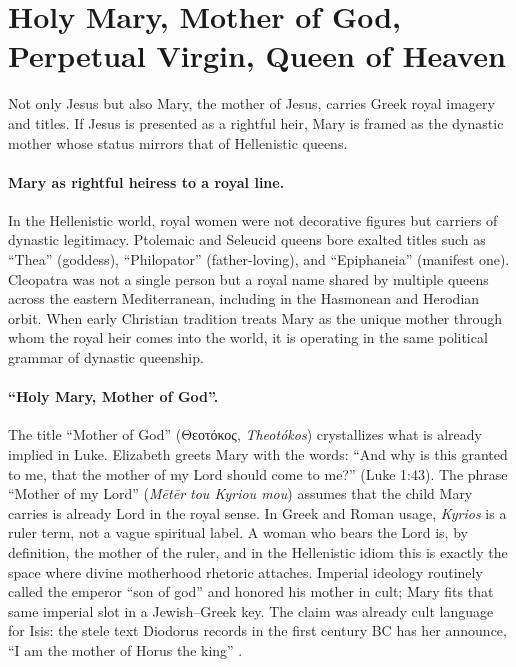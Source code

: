 \section{Holy Mary, Mother of God, Perpetual Virgin, Queen of Heaven}\label{sec:holy-mary-mother-of-god-perpetual-virgin-queen-of-heaven}

Not only Jesus but also Mary, the mother of Jesus, carries Greek royal imagery and titles.
If Jesus is presented as a rightful heir, Mary is framed as the dynastic mother whose status mirrors that of Hellenistic queens.

\paragraph{Mary as rightful heiress to a royal line.}
In the Hellenistic world, royal women were not decorative figures but carriers of dynastic legitimacy.
Ptolemaic and Seleucid queens bore exalted titles such as ``Thea'' (goddess), ``Philopator'' (father-loving), and ``Epiphaneia'' (manifest one).
Cleopatra was not a single person but a royal name shared by multiple queens across the eastern Mediterranean, including in the Hasmonean and Herodian orbit.
When early Christian tradition treats Mary as the unique mother through whom the royal heir comes into the world, it is operating in the same political grammar of dynastic queenship.

\paragraph{``Holy Mary, Mother of God''.}
The title ``Mother of God'' (Θεοτόκος, \textit{Theotókos}) crystallizes what is already implied in Luke.
Elizabeth greets Mary with the words: ``And why is this granted to me, that the mother of my Lord should come to me?'' (Luke 1:43).
The phrase ``Mother of my Lord'' (\emph{Mētēr tou Kyriou mou}) assumes that the child Mary carries is already Lord in the royal sense.
In Greek and Roman usage, \emph{Kyrios} is a ruler term, not a vague spiritual label.
A woman who bears the Lord is, by definition, the mother of the ruler, and in the Hellenistic idiom this is exactly the space where divine motherhood rhetoric attaches.
Imperial ideology routinely called the emperor ``son of god'' and honored his mother in cult; Mary fits that same imperial slot in a Jewish--Greek key.
The claim was already cult language for Isis: the stele text Diodorus records in the first century BC has her announce, ``I am the mother of Horus the king'' \cite[1.27]{diodorus:library}.

